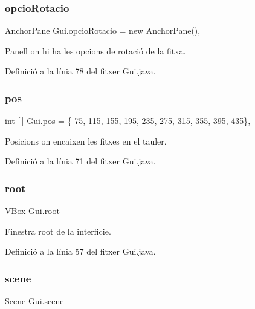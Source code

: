 \subsubsection{\texorpdfstring{opcio\+Rotacio}{opcioRotacio}}
{\footnotesize\ttfamily Anchor\+Pane Gui.\+opcio\+Rotacio = new Anchor\+Pane()\hspace{0.3cm}{\ttfamily [static]}, {\ttfamily [private]}}



Panell on hi ha les opcions de rotació de la fitxa. 



Definició a la línia 78 del fitxer Gui.\+java.

\mbox{\label{class_gui_abed40e74a4b6d812ce886e19e652df89}} 
\subsubsection{\texorpdfstring{pos}{pos}}
{\footnotesize\ttfamily int \mbox{[}$\,$\mbox{]} Gui.\+pos = \{ 75, 115, 155, 195, 235, 275, 315, 355, 395, 435\}\hspace{0.3cm}{\ttfamily [static]}, {\ttfamily [private]}}



Posicions on encaixen les fitxes en el tauler. 



Definició a la línia 71 del fitxer Gui.\+java.

\mbox{\label{class_gui_aa5fb03ea111e17f7ff7ae3d4ce32782a}} 
\subsubsection{\texorpdfstring{root}{root}}
{\footnotesize\ttfamily V\+Box Gui.\+root\hspace{0.3cm}{\ttfamily [private]}}



Finestra root de la interficie. 



Definició a la línia 57 del fitxer Gui.\+java.

\mbox{\label{class_gui_a0864db089f17216fd1901603a662e9d2}} 
\subsubsection{\texorpdfstring{scene}{scene}}
{\footnotesize\ttfamily Scene Gui.\+scene\hspace{0.3cm}{\ttfamily [private]}}



